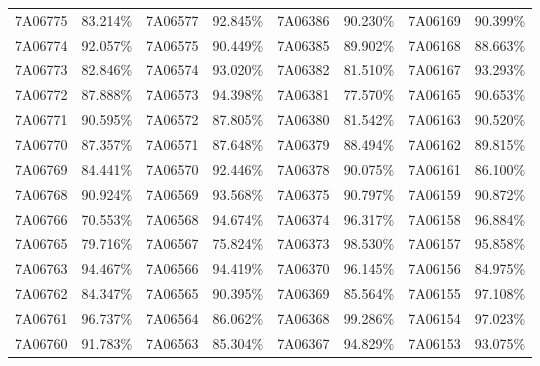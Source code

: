 \documentclass[12pt]{article}%
\begin{document}
\begin{longtable}{|cc|cc|cc|cc|}
7A06775              & 83.214\% & 7A06577              & 92.845\% & 7A06386              & 90.230\% & \multicolumn{1}{l}{7A06169             } & 90.399\% \\
7A06774              & 92.057\% & 7A06575              & 90.449\% & 7A06385              & 89.902\% & \multicolumn{1}{l}{7A06168             } & 88.663\% \\
7A06773              & 82.846\% & 7A06574              & 93.020\% & 7A06382              & 81.510\% & \multicolumn{1}{l}{7A06167             } & 93.293\% \\
7A06772              & 87.888\% & 7A06573              & 94.398\% & 7A06381              & 77.570\% & \multicolumn{1}{l}{7A06165             } & 90.653\% \\
7A06771              & 90.595\% & 7A06572              & 87.805\% & 7A06380              & 81.542\% & \multicolumn{1}{l}{7A06163             } & 90.520\% \\
7A06770              & 87.357\% & 7A06571              & 87.648\% & 7A06379              & 88.494\% & \multicolumn{1}{l}{7A06162             } & 89.815\% \\
7A06769              & 84.441\% & 7A06570              & 92.446\% & 7A06378              & 90.075\% & \multicolumn{1}{l}{7A06161             } & 86.100\% \\
7A06768              & 90.924\% & 7A06569              & 93.568\% & 7A06375              & 90.797\% & \multicolumn{1}{l}{7A06159             } & 90.872\% \\
7A06766              & 70.553\% & 7A06568              & 94.674\% & 7A06374              & 96.317\% & \multicolumn{1}{l}{7A06158             } & 96.884\% \\
7A06765              & 79.716\% & 7A06567              & 75.824\% & 7A06373              & 98.530\% & \multicolumn{1}{l}{7A06157             } & 95.858\% \\
7A06763              & 94.467\% & 7A06566              & 94.419\% & 7A06370              & 96.145\% & \multicolumn{1}{l}{7A06156             } & 84.975\% \\
7A06762              & 84.347\% & 7A06565              & 90.395\% & 7A06369              & 85.564\% & \multicolumn{1}{l}{7A06155             } & 97.108\% \\
7A06761              & 96.737\% & 7A06564              & 86.062\% & 7A06368              & 99.286\% & \multicolumn{1}{l}{7A06154             } & 97.023\% \\
7A06760              & 91.783\% & 7A06563              & 85.304\% & 7A06367              & 94.829\% & \multicolumn{1}{l}{7A06153             } & 93.075\% \\

\end{longtable}
\end{document}

